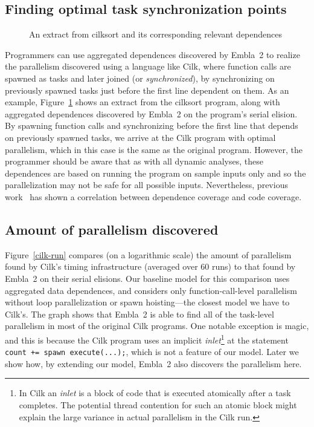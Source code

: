 \subsection{Finding optimal task synchronization points} \label{sresults:cilk-spawns}
\begin{figure}[t]
  \begin{center}
  \scriptsize
  
  \end{center}
  \caption{An extract from \textsf{cilksort} and its corresponding relevant dependences}
  \label{cilksort-depgraph}
\end{figure}

Programmers can use aggregated dependences discovered by Embla~2 to realize the parallelism discovered using a language like Cilk,
where function calls are spawned as tasks and later joined (or \emph{synchronized}),
by synchronizing on previously spawned tasks just before the first line dependent on them.
As an example, Figure~\ref{cilksort-depgraph} shows an extract from the \textsf{cilksort} program,
along with aggregated dependences discovered by Embla~2 on the program's serial elision.
By spawning function calls and synchronizing before the first line that depends on previously spawned tasks,
we arrive at the Cilk program with optimal parallelism, which in this case is the same as the original program.
However, the programmer should be aware that as with all dynamic analyses,
these dependences are based on running the program on sample inputs only and so the parallelization may not be safe for all possible inputs.
Nevertheless, previous work~\cite{embla:08} has shown a correlation between dependence coverage and code coverage.

\subsection{Amount of parallelism discovered} \label{sresults:cilk-limits}

Figure~\ref{cilk-run} compares (on a logarithmic scale) the amount of parallelism found by Cilk's timing infrastructure (averaged over 60 runs) to that found by Embla~2 on their serial elisions.
Our baseline model for this comparison uses aggregated data dependences, and considers only function-call-level parallelism without loop parallelization or spawn hoisting---the closest model we have to Cilk's.
The graph shows that Embla~2 is able to find all of the task-level parallelism in most of the original Cilk programs.
One notable exception is \textsf{magic},
and this is because the Cilk program uses an implicit \emph{inlet}\footnote{In Cilk an \emph{inlet} is a block of code that is executed atomically after a task completes. The potential thread contention for such an atomic block might explain the large variance in actual parallelism in the Cilk run.} at the statement \texttt{count += spawn execute(...);},
which is not a feature of our model.
Later we show how, by extending our model, Embla~2 also discovers the parallelism here.

